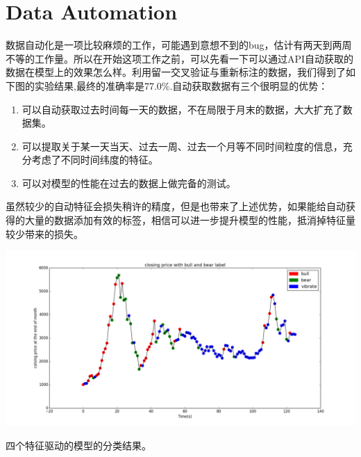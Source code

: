 \documentclass[10pt,a4paper]{article}
\begin{document}
\section{Data Automation }
数据自动化是一项比较麻烦的工作，可能遇到意想不到的bug，估计有两天到两周不等的工作量。所以在开始这项工作之前，可以先看一下可以通过API自动获取的数据在模型上的效果怎么样。利用留一交叉验证与重新标注的数据，我们得到了如下图的实验结果,最终的准确率是77.0\%.自动获取数据有三个很明显的优势：
\begin{enumerate}
	\item 可以自动获取过去时间每一天的数据，不在局限于月末的数据，大大扩充了数据集。
	\item 可以提取关于某一天当天、过去一周、过去一个月等不同时间粒度的信息，充分考虑了不同时间纬度的特征。
	\item 可以对模型的性能在过去的数据上做完备的测试。
\end{enumerate}
虽然较少的自动特征会损失稍许的精度，但是也带来了上述优势，如果能给自动获得的大量的数据添加有效的标签，相信可以进一步提升模型的性能，抵消掉特征量较少带来的损失。
\begin{center}
	\includegraphics[width=1\textwidth]{四个特征第五次调整.png}
	\caption{四个特征驱动的模型的分类结果。}
\end{center}

%	
	
\end{document}
